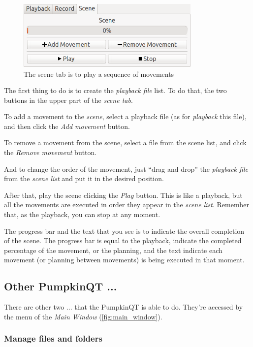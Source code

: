 \documentclass[oneside,a4paper,titlepage]{article}
\begin{document}
	\begin{figure}[ht!]
		\centering
		\includegraphics[width=0.8\textwidth]{scene_tab}
		\caption[Scene Tab]{The scene tab is to play a sequence of movements}
		\label{fig:scene_tab}
	\end{figure}
	
	The first thing to do is to create the \emph{playback file} list. To do that, the two buttons in the upper part of the \emph{scene tab}.
	
	To add a movement to the \emph{scene}, select a playback file (as for \emph{playback} this file), and then click the \emph{Add movement} button.
	
	To remove a movement from the scene, select a file from the scene list, and click the \emph{Remove movement} button.
	
	And to change the order of the movement, just ``drag and drop'' the \emph{playback file} from the \emph{scene list} and put it in the desired position.
	
	After that, play the scene clicking the \emph{Play} button. This is like a playback, but all the movements are executed in order they appear in the \emph{scene list}. Remember that, as the playback, you can stop at any moment.
	
	The progress bar and the text that you see is to indicate the overall completion of the scene. The progress bar is equal to the playback, indicate the completed percentage of the movement, or the planning, and the text indicate each movement (or planning between movements) is being executed in that moment.
	
\subsection{Other PumpkinQT ...}

There are other two ... that the PumpkinQT is able to do. They're accessed by the menu of the \emph{Main Window} (\ref{fig:main_window}). 

\subsubsection{Manage files and folders}
\end{document}
